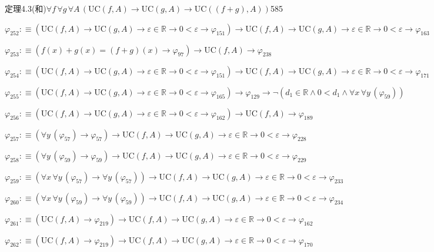 \begin{fullproof}{定理4.3(和)}{$\forall f\,\forall g\,\forall A\,(\mathrm{UC}(f,A) \to \mathrm{UC}(g,A) \to \mathrm{UC}((f + g),A))$}{585}
\begin{abbrevlist}
\item $\varphi_{252} :\equiv (\mathrm{UC}(f,A) \to \mathrm{UC}(g,A) \to \varepsilon \in \mathbb{R} \to 0 < \varepsilon \to \varphi_{151}) \to \mathrm{UC}(f,A) \to \mathrm{UC}(g,A) \to \varepsilon \in \mathbb{R} \to 0 < \varepsilon \to \varphi_{163}$
\item $\varphi_{253} :\equiv (f(x) + g(x) = (f + g)(x) \to \varphi_{97}) \to \mathrm{UC}(f,A) \to \varphi_{238}$
\item $\varphi_{254} :\equiv (\mathrm{UC}(f,A) \to \mathrm{UC}(g,A) \to \varepsilon \in \mathbb{R} \to 0 < \varepsilon \to \varphi_{151}) \to \mathrm{UC}(f,A) \to \mathrm{UC}(g,A) \to \varepsilon \in \mathbb{R} \to 0 < \varepsilon \to \varphi_{171}$
\item $\varphi_{255} :\equiv (\mathrm{UC}(f,A) \to \mathrm{UC}(g,A) \to \varepsilon \in \mathbb{R} \to 0 < \varepsilon \to \varphi_{165}) \to \varphi_{129} \to \neg (d_{1} \in \mathbb{R} \land 0 < d_{1} \land \forall x\,\forall y\,(\varphi_{59}))$
\item $\varphi_{256} :\equiv (\mathrm{UC}(f,A) \to \mathrm{UC}(g,A) \to \varepsilon \in \mathbb{R} \to 0 < \varepsilon \to \varphi_{162}) \to \mathrm{UC}(f,A) \to \varphi_{189}$
\item $\varphi_{257} :\equiv (\forall y\,(\varphi_{57}) \to \varphi_{57}) \to \mathrm{UC}(f,A) \to \mathrm{UC}(g,A) \to \varepsilon \in \mathbb{R} \to 0 < \varepsilon \to \varphi_{228}$
\item $\varphi_{258} :\equiv (\forall y\,(\varphi_{59}) \to \varphi_{59}) \to \mathrm{UC}(f,A) \to \mathrm{UC}(g,A) \to \varepsilon \in \mathbb{R} \to 0 < \varepsilon \to \varphi_{229}$
\item $\varphi_{259} :\equiv (\forall x\,\forall y\,(\varphi_{57}) \to \forall y\,(\varphi_{57})) \to \mathrm{UC}(f,A) \to \mathrm{UC}(g,A) \to \varepsilon \in \mathbb{R} \to 0 < \varepsilon \to \varphi_{233}$
\item $\varphi_{260} :\equiv (\forall x\,\forall y\,(\varphi_{59}) \to \forall y\,(\varphi_{59})) \to \mathrm{UC}(f,A) \to \mathrm{UC}(g,A) \to \varepsilon \in \mathbb{R} \to 0 < \varepsilon \to \varphi_{234}$
\item $\varphi_{261} :\equiv (\mathrm{UC}(f,A) \to \varphi_{219}) \to \mathrm{UC}(f,A) \to \mathrm{UC}(g,A) \to \varepsilon \in \mathbb{R} \to 0 < \varepsilon \to \varphi_{162}$
\item $\varphi_{262} :\equiv (\mathrm{UC}(f,A) \to \varphi_{219}) \to \mathrm{UC}(f,A) \to \mathrm{UC}(g,A) \to \varepsilon \in \mathbb{R} \to 0 < \varepsilon \to \varphi_{170}$

\end{abbrevlist}
\end{fullproof}
